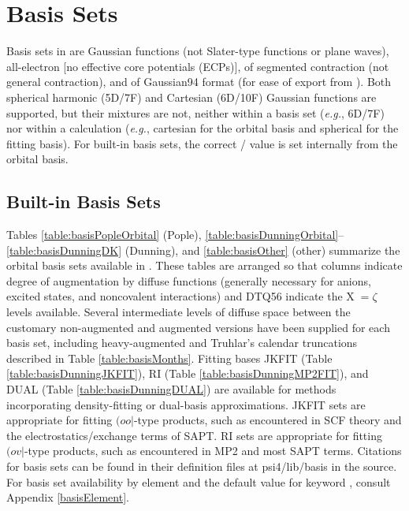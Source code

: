\section{Basis Sets}
\label{sec:basis}
\renewcommand{\optionname}[2]{\texttt{\nameref{op-#2-#1}}}

Basis sets in \PSIfour are Gaussian functions (not Slater-type functions or plane waves), 
all-electron [no effective core potentials (ECPs)], of segmented contraction (not general contraction), 
and of Gaussian94 format (for ease of export from ). 
Both spherical harmonic (5D/7F) and Cartesian (6D/10F) Gaussian functions are supported, 
but their mixtures are not, neither within a basis set (\textit{e.g.}, 6D/7F) nor within a calculation
(\textit{e.g.}, cartesian for the orbital basis and spherical for the fitting basis).
For built-in basis sets, the correct / value is set internally from the orbital basis.


\subsection{Built-in Basis Sets} Tables \ref{table:basisPopleOrbital} (Pople),
\ref{table:basisDunningOrbital}--\ref{table:basisDunningDK} (Dunning), and
\ref{table:basisOther} (other) summarize the orbital basis sets available in
\PSIfour.  These tables are arranged so that columns indicate degree of
augmentation by diffuse functions (generally necessary for anions, excited
states, and noncovalent interactions) and DTQ56 indicate the X$\;=\zeta$ levels
available.  Several intermediate levels of diffuse space between the customary
non-augmented and augmented versions have been supplied for each basis set,
including heavy-augmented and Truhlar's\cite{Papajak:2011:10} calendar
truncations described in Table \ref{table:basisMonths}.  Fitting bases JKFIT
(Table \ref{table:basisDunningJKFIT}), RI (Table
\ref{table:basisDunningMP2FIT}), and DUAL (Table \ref{table:basisDunningDUAL})
are available for methods incorporating density-fitting or dual-basis
approximations. JKFIT sets are appropriate for fitting $(oo|$-type products,
such as encountered in SCF theory and the electrostatics/exchange terms of SAPT.
RI sets are appropriate for fitting $(ov|$-type products, such as encountered in
MP2 and most SAPT terms.  Citations for basis sets can be found in their
definition files at psi4/lib/basis in the source.  For basis set availability by
element and the default value for keyword \optionname{PUREAM}{GLOBALS}, consult
Appendix \ref{basisElement}.

